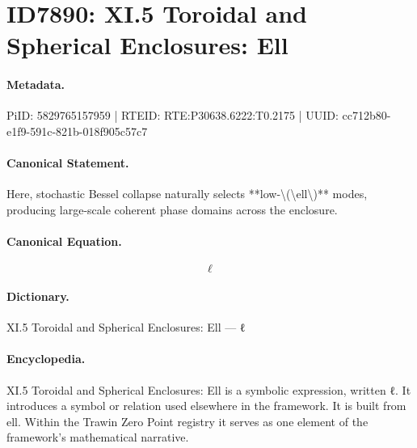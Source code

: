 \section*{ID7890: XI.5 Toroidal and Spherical Enclosures: Ell}
\paragraph{Metadata.}
PiID: 5829765157959 | RTEID: RTE:P30638.6222:T0.2175 | UUID: cc712b80-e1f9-591c-821b-018f905c57c7

\paragraph{Canonical Statement.}
Here, stochastic Bessel collapse naturally selects **low-\textbackslash{}(\textbackslash{}ell\textbackslash{})** modes, producing large-scale coherent phase domains across the enclosure.

\paragraph{Canonical Equation.}
\[
\ell
\]

\paragraph{Dictionary.}
XI.5 Toroidal and Spherical Enclosures: Ell — ℓ

\paragraph{Encyclopedia.}
XI.5 Toroidal and Spherical Enclosures: Ell is a symbolic expression, written ℓ. It introduces a symbol or relation used elsewhere in the framework. It is built from ell. Within the Trawin Zero Point registry it serves as one element of the framework's mathematical narrative.
